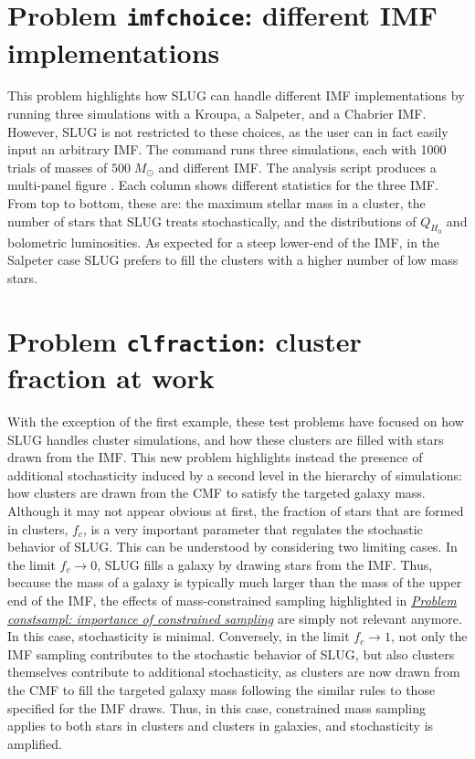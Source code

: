 \documentclass[letterpaper,10pt,english]{sphinxmanual}
\begin{document}
\section{Problem \texttt{imfchoice}: different IMF implementations}
\label{tests:problem-imfchoice-different-imf-implementations}\label{tests:probimf-label}
This problem highlights how SLUG can handle different IMF implementations by running
three simulations with a Kroupa, a Salpeter, and a Chabrier IMF. However, SLUG is not
restricted to these choices, as the user can in fact easily input an arbitrary IMF.
The command   runs three  simulations, each with 1000 trials
of masses of \(500\;M_\odot\) and different IMF. The analysis script
 produces a multi-panel figure .
Each column shows different statistics for the three IMF. From top to bottom, these are:
the maximum stellar mass in a cluster, the number of stars that SLUG treats stochastically,
and the distributions of \(Q_{H_0}\)  and bolometric luminosities.
As expected for a steep lower-end of the IMF, in the Salpeter case SLUG prefers to fill the
clusters with a higher number of low mass stars.


\section{Problem \texttt{clfraction}: cluster fraction at work}
\label{tests:problem-clfraction-cluster-fraction-at-work}
With the exception of the first example, these test problems have focused on how SLUG handles
cluster simulations, and how these clusters are filled with stars drawn from the IMF.
This new problem highlights instead the presence of additional stochasticity induced by a
second level in the hierarchy of  simulations: how clusters are drawn from the CMF to satisfy the
targeted galaxy mass. Although it may not appear obvious at first,
the fraction of stars that are formed in clusters, \(f_c\), is a very important parameter that regulates
the stochastic behavior of SLUG. This can be understood by considering two limiting cases.
In the limit \(f_c \rightarrow 0\), SLUG fills a galaxy by drawing stars from the
IMF. Thus, because the mass of a galaxy is typically much larger than the mass of the upper
end of the IMF, the effects of mass-constrained sampling highlighted in {\hyperref[tests:probsampl-label]{\emph{Problem constsampl: importance of constrained sampling}}} are simply
not relevant anymore. In this case, stochasticity is minimal.
Conversely, in the limit \(f_c \rightarrow 1\), not only the IMF sampling contributes to the
stochastic behavior of SLUG, but also clusters themselves contribute to additional stochasticity,
as clusters are now drawn from the CMF to fill the targeted galaxy mass following the similar rules
to those specified for the IMF draws. Thus, in this case, constrained mass sampling applies to both
stars in clusters and clusters in galaxies, and stochasticity is amplified.
\end{document}

